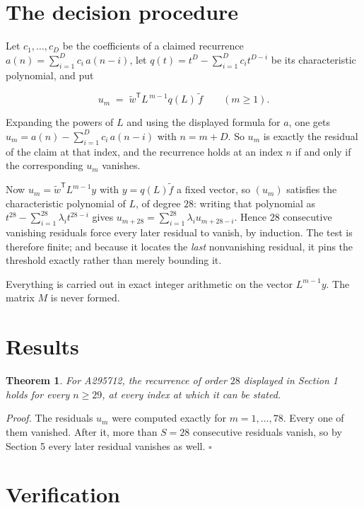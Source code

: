 \documentclass[11pt]{article}
\newtheorem{theorem}{Theorem}
\theoremstyle{definition}
\begin{document}
\section{The decision procedure}

Let $c_1,\dots,c_D$ be the coefficients of a claimed recurrence $a(n) = \sum_{i=1}^{D} c_i\,a(n-i)$, let $q(t) = t^{D} - \sum_{i=1}^{D} c_i t^{D-i}$ be its characteristic polynomial, and put

\[u_m \;=\; \tilde w^{\mathsf T} L^{\,m-1} q(L)\,\tilde f \qquad (m \ge 1).\]

Expanding the powers of $L$ and using the displayed formula for $a$, one gets $u_m = a(n) - \sum_{i=1}^{D} c_i\,a(n-i)$ with $n = m + D$. So $u_m$ is exactly the residual of the claim at that index, and the recurrence holds at an index $n$ if and only if the corresponding $u_m$ vanishes.

Now $u_m = \tilde w^{\mathsf T} L^{m-1} y$ with $y = q(L)\tilde f$ a fixed vector, so $(u_m)$ satisfies the characteristic polynomial of $L$, of degree $28$: writing that polynomial as $t^{28} - \sum_{i=1}^{28} \lambda_i t^{28-i}$ gives $u_{m+28} = \sum_{i=1}^{28} \lambda_i u_{m+28-i}$. Hence $28$ consecutive vanishing residuals force every later residual to vanish, by induction. The test is therefore finite; and because it locates the {\itshape last} nonvanishing residual, it pins the threshold exactly rather than merely bounding it.

Everything is carried out in exact integer arithmetic on the vector $L^{m-1}y$. The matrix $M$ is never formed.

\section{Results}

\begin{theorem} For A295712, the recurrence of order $28$ displayed in Section 1 holds for every $n \ge 29$, at every index at which it can be stated.\end{theorem}

{\itshape Proof.} The residuals $u_m$ were computed exactly for $m = 1,\dots,78$. Every one of them vanished. After it, more than $S = 28$ consecutive residuals vanish, so by Section 5 every later residual vanishes as well. $\square$

\section{Verification}
\end{document}
